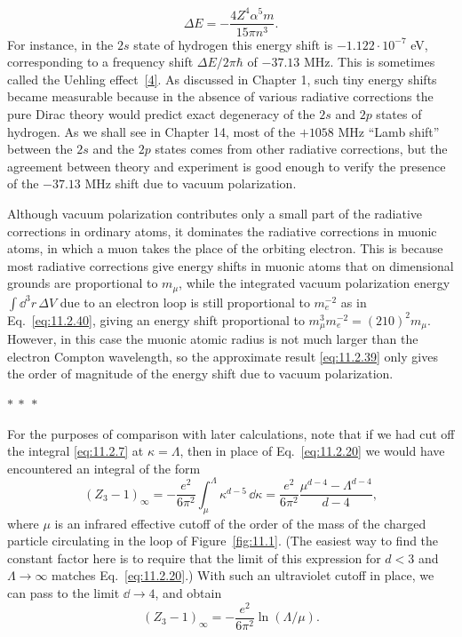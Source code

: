 \begin{equation}
  \Delta E=-\frac{4Z^4\alpha^5m}{15\pi n^3}.
  \tag{11.2.42}\label{eq:11.2.42}
\end{equation}
For instance, in the $2s$ state of hydrogen this energy shift is
$-1.122\cdot10^{-7}$ eV, corresponding to a frequency shift
$\Delta E/2\pi\hbar$ of $-37.13$ MHz. This is sometimes called the
Uehling effect~\hyperref[ref:11.4]{[4]}. As discussed in Chapter 1, such tiny energy shifts became
measurable because in the absence of various radiative corrections the pure
Dirac theory would predict exact degeneracy of the $2s$ and $2p$ states of
hydrogen. As we shall see in Chapter 14, most of the $+1058$ MHz ``Lamb
shift'' between the $2s$ and the $2p$ states comes from other radiative
corrections, but the agreement between theory and experiment is good enough
to verify the presence of the $-37.13$ MHz shift due to vacuum polarization.

Although vacuum polarization contributes only a small part of the radiative
corrections in ordinary atoms, it dominates the radiative corrections in
muonic atoms, in which a muon takes the place of the orbiting electron.
This is because most radiative corrections give energy shifts in muonic atoms
that on dimensional grounds are proportional to $m_\mu$, while the integrated
vacuum polarization energy $\int \dd^3r\,\Delta V$ due to an electron loop is
still proportional to $m_e^{-2}$ as in Eq.~\eqref{eq:11.2.40}, giving an energy shift
proportional to $m_\mu^3m_e^{-2}=(210)^2m_\mu$. However, in this case the
muonic atomic radius is not much larger than the electron Compton wavelength,
so the approximate result \eqref{eq:11.2.39} only gives the order of magnitude of the
energy shift due to vacuum polarization.

\begin{center}
  $*\ *\ *$
\end{center}

For the purposes of comparison with later calculations, note that if we
had cut off the integral \eqref{eq:11.2.7} at $\kappa=\Lambda$, then in place of
Eq.~\eqref{eq:11.2.20} we would have encountered an integral of the form
\[
  (Z_3-1)_\infty=-\frac{e^2}{6\pi^2}\int_\mu^\Lambda
  \kappa^{d-5}\,\dd\kappa
  =\frac{e^2}{6\pi^2}\frac{\mu^{d-4}-\Lambda^{d-4}}{d-4},
\]
where $\mu$ is an infrared effective cutoff of the order of the mass of the
charged particle circulating in the loop of Figure~\ref{fig:11.1}. (The easiest way to
find the constant factor here is to require that the limit of this expression
for $d<3$ and $\Lambda\to\infty$ matches Eq.~\eqref{eq:11.2.20}.) With such an
ultraviolet cutoff in place, we can pass to the limit $\dd\to4$, and obtain
\begin{equation}
  (Z_3-1)_\infty=-\frac{e^2}{6\pi^2}\ln(\Lambda/\mu).
  \tag{11.2.43}\label{eq:11.2.43}
\end{equation}
